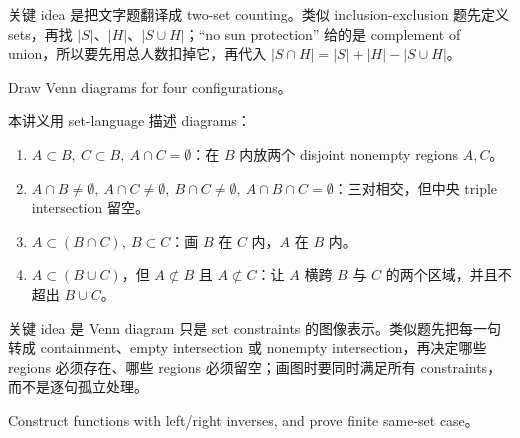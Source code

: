 \begin{explanation}
关键 idea 是把文字题翻译成 two-set counting。类似 inclusion-exclusion 题先定义 sets，再找 \(|S|\)、\(|H|\)、\(|S\cup H|\)；``no sun protection'' 给的是 complement of union，所以要先用总人数扣掉它，再代入 \(|S\cap H|=|S|+|H|-|S\cup H|\)。
\end{explanation}

\begin{exerciseblock}
Draw Venn diagrams for four configurations。
\end{exerciseblock}

\begin{solution}
本讲义用 set-language 描述 diagrams：
\begin{enumerate}[label=\arabic*.]
  \item \(A\subset B,\ C\subset B,\ A\cap C=\emptyset\)：在 \(B\) 内放两个 disjoint nonempty regions \(A,C\)。
  \item \(A\cap B\ne\emptyset,\ A\cap C\ne\emptyset,\ B\cap C\ne\emptyset,\ A\cap B\cap C=\emptyset\)：三对相交，但中央 triple intersection 留空。
  \item \(A\subset(B\cap C),\ B\subset C\)：画 \(B\) 在 \(C\) 内，\(A\) 在 \(B\) 内。
  \item \(A\subset(B\cup C)\)，但 \(A\not\subset B\) 且 \(A\not\subset C\)：让 \(A\) 横跨 \(B\) 与 \(C\) 的两个区域，并且不超出 \(B\cup C\)。
\end{enumerate}
\end{solution}

\begin{explanation}
关键 idea 是 Venn diagram 只是 set constraints 的图像表示。类似题先把每一句转成 containment、empty intersection 或 nonempty intersection，再决定哪些 regions 必须存在、哪些 regions 必须留空；画图时要同时满足所有 constraints，而不是逐句孤立处理。
\end{explanation}

\begin{exerciseblock}
Construct functions with left/right inverses, and prove finite same-set case。
\end{exerciseblock}

